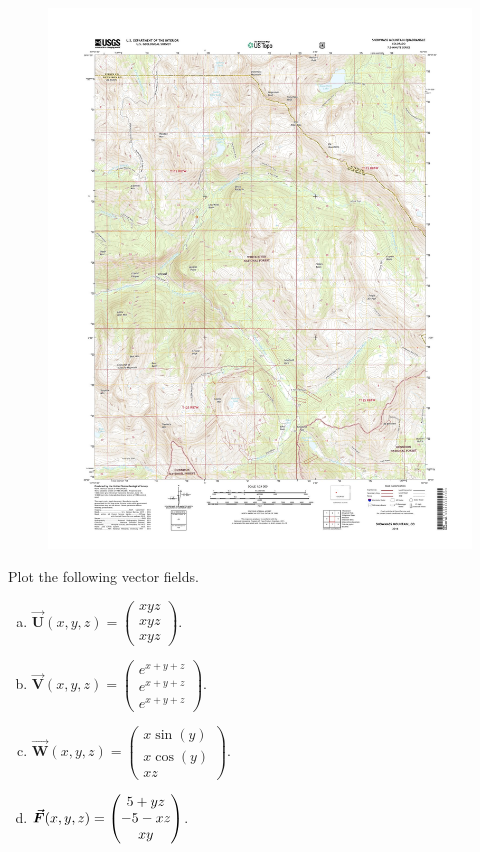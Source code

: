 \documentclass[12pt]{article} %
\newcommand{\vecfieldV}{\boldsymbol{\vec{V}}}
\newcommand{\vecfieldU}{\boldsymbol{\vec{U}}}
\newcommand{\vecfieldW}{\boldsymbol{\vec{W}}}
\begin{document}
\begin{problem}
\begin{figure}[H]
		\includegraphics[width=1.1\textwidth]{figures/snowmass_topo.jpg}
	\end{figure}
\end{problem}

\begin{problem}
Plot the following vector fields.
\begin{multicols}{2}
\begin{enumerate}[(a)]
    \item $\vecfieldU(x,y,z) = \begin{pmatrix} xyz \\ xyz \\ xyz \end{pmatrix}$.
    \item $\vecfieldV(x,y,z) = \begin{pmatrix} e^{x+y+z} \\ e^{x+y+z} \\ e^{x+y+z} \end{pmatrix}$.
    \item $\vecfieldW(x,y,z) = \begin{pmatrix} x \sin(y) \\ x \cos(y) \\ xz \end{pmatrix}$.
    \item $\boldsymbol{\vec{F}}(x,y,z) = \begin{pmatrix} 5 + yz \\ -5 -xz \\ xy \end{pmatrix}$.
\end{enumerate}
\end{multicols}
\end{problem}
\end{document}
